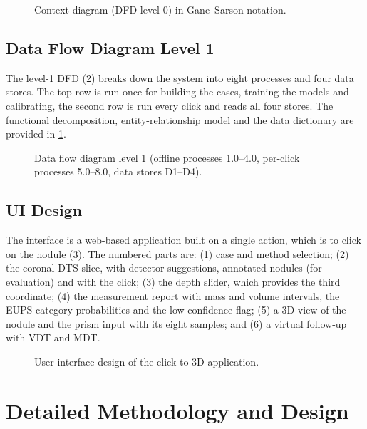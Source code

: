 \begin{figure}[htbp]
  \centering
  \resizebox{0.92\linewidth}{!}{}
  \caption{Context diagram (DFD level 0) in Gane--Sarson notation.}
  \label{fig:context}
\end{figure}

\subsection{Data Flow Diagram Level 1}

The level-1 DFD (\cref{fig:dfd1}) breaks down the system into eight processes and four data stores. The top row is run once for building the cases, training the models and calibrating, the second row is run every click and reads all four stores. The functional decomposition, entity-relationship model and the data dictionary are provided in \cref{sec:method}.

\begin{figure}[htbp]
  \centering
  \resizebox{\linewidth}{!}{}
  \caption{Data flow diagram level 1 (offline processes 1.0--4.0, per-click processes 5.0--8.0, data stores D1--D4).}
  \label{fig:dfd1}
\end{figure}





\subsection{UI Design}

The interface is a web-based application built on a single action, which is to click on the nodule (\cref{fig:ui}). The numbered parts are: (1) case and method selection; (2) the coronal DTS slice, with detector suggestions, annotated nodules (for evaluation) and with the click; (3) the depth slider, which provides the third coordinate; (4) the measurement report with mass and volume intervals, the EUPS category probabilities and the low-confidence flag; (5) a 3D view of the nodule and the prism input with its eight samples; and (6) a virtual follow-up with VDT and MDT.

\begin{figure}[htbp]
  \centering
  \resizebox{\linewidth}{!}{}
  \caption{User interface design of the click-to-3D application.}
  \label{fig:ui}
\end{figure}

\section{Detailed Methodology and Design}
\label{sec:method}

